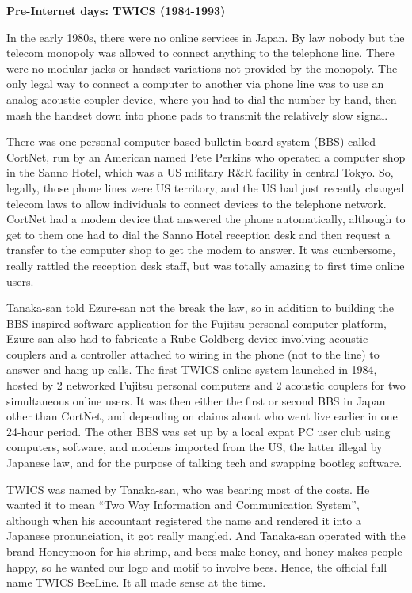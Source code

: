 \textbf{Pre-Internet days: TWICS (1984-1993)}

In the early 1980s, there were no online services in Japan. By law nobody but the telecom monopoly was allowed to connect anything to the telephone line. There were no modular jacks or handset variations not provided by the monopoly. The only legal way to connect a computer to another via phone line was to use an analog acoustic coupler device, where you had to dial the number by hand, then mash the handset down into phone pads to transmit the relatively slow signal.

There was one personal computer-based bulletin board system (BBS) called CortNet, run by an American named Pete Perkins who operated a computer shop in the Sanno Hotel, which was a US military R\&R facility in central Tokyo. So, legally, those phone lines were US territory, and the US had just recently changed telecom laws to allow individuals to connect devices to the telephone network. CortNet had a modem device that answered the phone automatically, although to get to them one had to dial the Sanno Hotel reception desk and then request a transfer to the computer shop to get the modem to answer. It was cumbersome, really rattled the reception desk staff, but was totally amazing to first time online users.

Tanaka-san told Ezure-san not the break the law, so in addition to building the BBS-inspired software application for the Fujitsu personal computer platform, Ezure-san also had to fabricate a Rube Goldberg device involving acoustic couplers and a controller attached to wiring in the phone (not to the line) to answer and hang up calls. The first TWICS online system launched in 1984, hosted by 2 networked Fujitsu personal computers and 2 acoustic couplers for two simultaneous online users. It was then either the first or second BBS in Japan other than CortNet, and depending on claims about who went live earlier in one 24-hour period. The other BBS was set up by a local expat PC user club using computers, software, and modems imported from the US, the latter illegal by Japanese law, and for the purpose of talking tech and swapping bootleg software.

TWICS was named by Tanaka-san, who was bearing most of the costs. He wanted it to mean “Two Way Information and Communication System”, although when his accountant registered the name and rendered it into a Japanese pronunciation, it got really mangled. And Tanaka-san operated with the brand Honeymoon for his shrimp, and bees make honey, and honey makes people happy, so he wanted our logo and motif to involve bees. Hence, the official full name TWICS BeeLine. It all made sense at the time.

